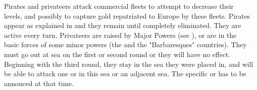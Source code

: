 \aparag Pirates and privateers attack commercial fleets to attempt to decrease
their levels, and possibly to capture gold repatriated to Europe by these
fleets.
\bparag[Pirates] Pirates appear as explained in  and
they remain until completely eliminated. They are active every turn.
\bparag[Privateers]
\label{chRedep:CorsairAttack Privateer}
Privateers are raised by Major Powers (see ), or are in the basic forces of some minor powers (the
 and the "Barbaresques" countries). They must go out at sea
on the first or second round or they will have no effect.
\bparag Beginning with the third round, they stay in the sea they were placed
in, and will be able to attack one \STZ or \CTZ in this sea or an adjacent
sea. The specific \STZ or \CTZ has to be annouced at that time.

